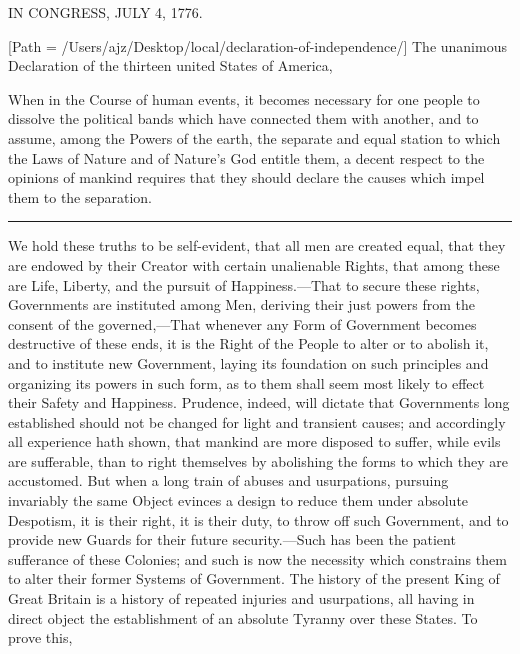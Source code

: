 \documentclass{article}
\begin{document}
\begin{center}
\Huge{}I\huge{}N \Huge CONGRESS, J\huge{}ULY \Huge 4, 1776.
\end{center}

\noindent{}[Path = /Users/ajz/Desktop/local/declaration-of-independence/]
\LARGE The unanimous Declaration \normalsize of the thirteen united
\LARGE States of America,

\vspace{1.5ex}

\large When \normalsize \rmfamily in the Course of human events, it
becomes necessary for one people to dissolve the political bands which
have connected them with another, and to assume, among the Powers of
the earth, the separate and equal station to which the Laws of Nature
and of Nature's God entitle them, a decent respect to the opinions of
mankind requires that they should declare the causes which impel them
to the separation.\rule[.5ex]{4em}{.2pt}We hold these truths to be
self-evident, that all men are created equal, that they are endowed by
their Creator with certain unalienable Rights, that among these are
Life, Liberty, and the pursuit of Happiness.---That to secure these
rights, Governments are instituted among Men, deriving their just
powers from the consent of the governed,---That whenever any Form of
Government becomes destructive of these ends, it is the Right of the
People to alter or to abolish it, and to institute new Government,
laying its foundation on such principles and organizing its powers in
such form, as to them shall seem most likely to effect their Safety
and Happiness. Prudence, indeed, will dictate that Governments long
established should not be changed for light and transient causes; and
accordingly all experience hath shown, that mankind are more disposed
to suffer, while evils are sufferable, than to right themselves by
abolishing the forms to which they are accustomed. But when a long
train of abuses and usurpations, pursuing invariably the same Object
evinces a design to reduce them under absolute Despotism, it is their
right, it is their duty, to throw off such Government, and to provide
new Guards for their future security.---Such has been the patient
sufferance of these Colonies; and such is now the necessity which
constrains them to alter their former Systems of Government. The
history of the present King of Great Britain is a history of repeated
injuries and usurpations, all having in direct object the
establishment of an absolute Tyranny over these States. To prove this,
\end{document}

